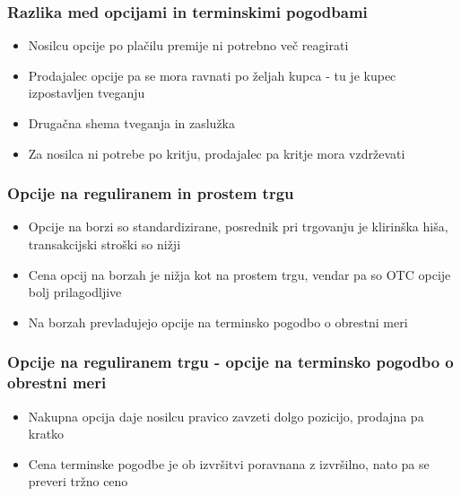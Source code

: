 \documentclass[14pt]{beamer}
\begin{document}
\begin{frame}
    \frametitle{Razlika med opcijami in terminskimi pogodbami}
    \begin{itemize}
        \item Nosilcu opcije po plačilu premije ni potrebno več reagirati
        \item Prodajalec opcije pa se mora ravnati po željah kupca - tu je kupec izpostavljen tveganju
        \pause
        \item Drugačna shema tveganja in zaslužka
        \pause
        \item Za nosilca ni potrebe po kritju, prodajalec pa kritje mora vzdrževati
    \end{itemize}
\end{frame}

\begin{frame}
    \frametitle{Opcije na reguliranem in prostem trgu}
    \begin{itemize}
        \item Opcije na borzi so standardizirane, posrednik pri trgovanju je klirinška hiša, transakcijski stroški so nižji
        \item Cena opcij na borzah je nižja kot na prostem trgu, vendar pa so OTC opcije bolj prilagodljive
        \item Na borzah prevladujejo opcije na terminsko pogodbo o obrestni meri
    \end{itemize}
\end{frame}

\begin{frame}
    \frametitle{Opcije na reguliranem trgu - opcije na terminsko pogodbo o obrestni meri}
    \begin{itemize}
        \item Nakupna opcija daje nosilcu pravico zavzeti dolgo pozicijo, prodajna pa kratko
        \item Cena terminske pogodbe je ob izvršitvi poravnana z izvršilno, nato pa se preveri tržno ceno
    \end{itemize}
\end{frame}

\end{document}

